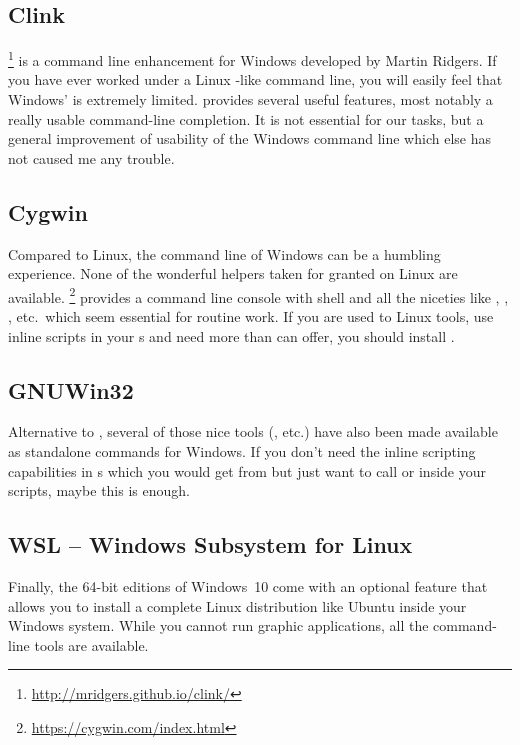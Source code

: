 \subsection{Clink}
\label{sec:landscapes:clink}

\footnote{\url{http://mridgers.github.io/clink/}} is a command
line enhancement for Windows developed by Martin Ridgers. If you have
ever worked under a Linux -like command line, you will
easily feel that Windows'  is extremely limited. 
provides several useful features, most notably a really usable
command-line completion. It is not essential for our tasks, but a
general improvement of usability of the Windows command line which
else has not caused me any trouble.

\subsection{Cygwin}
\label{sec:landscapes:cygwin}

Compared to Linux, the command line of Windows can be a humbling experience. None of
the wonderful helpers taken for granted on Linux are
available. \footnote{\url{https://cygwin.com/index.html}}
provides a command line console with  shell and all the
niceties like , , , etc.\ which seem
essential for routine work.  If you are used to Linux tools, use
inline scripts in your s and need more than  can
offer, you should install .

\subsection{GNUWin32}
\label{sec:landscapes:GNUwin32}

Alternative to , several of those nice tools (,
 etc.) have also been made available as standalone commands
for Windows. If you don't need the inline scripting capabilities in
s which you would get from  but just want to call
 or  inside your  scripts, maybe this is enough.

\subsection{WSL -- Windows Subsystem for Linux}
\label{sec:landscapes:WSL}

Finally, the 64-bit editions of Windows~10 come with an optional
feature that allows you to install a complete Linux distribution like
Ubuntu inside your Windows system. While you cannot run graphic
applications, all the command-line tools are available.



